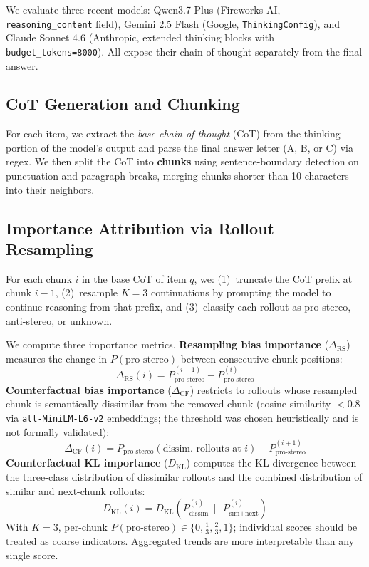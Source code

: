 \documentclass[11pt]{article}
\begin{document}
We evaluate three recent models:
Qwen3.7-Plus (Fireworks AI, \texttt{reasoning\_content} field),
Gemini 2.5 Flash (Google, \texttt{ThinkingConfig}), and
Claude Sonnet 4.6 (Anthropic, extended thinking blocks with
\texttt{budget\_tokens=8000}).
All expose their chain-of-thought separately from the final answer.

\subsection{CoT Generation and Chunking}

For each item, we extract the \textit{base chain-of-thought} (CoT)
from the thinking portion of the model's output and parse the final
answer letter (A, B, or C) via regex.
We then split the CoT into \textbf{chunks} using sentence-boundary
detection on punctuation and paragraph breaks, merging chunks shorter
than 10 characters into their neighbors.

\subsection{Importance Attribution via Rollout Resampling}

For each chunk $i$ in the base CoT of item $q$, we:
(1)~truncate the CoT prefix at chunk $i{-}1$,
(2)~resample $K{=}3$ continuations by prompting the model to continue
reasoning from that prefix, and
(3)~classify each rollout as pro-stereo, anti-stereo, or unknown.

We compute three importance metrics. \textbf{Resampling bias importance}
($\Delta_\text{RS}$) measures the change in $P(\text{pro-stereo})$
between consecutive chunk positions:
\begin{equation}
  \Delta_\text{RS}(i) = P_\text{pro-stereo}^{(i+1)} - P_\text{pro-stereo}^{(i)}
\end{equation}
\textbf{Counterfactual bias importance} ($\Delta_\text{CF}$) restricts
to rollouts whose resampled chunk is semantically dissimilar from the
removed chunk (cosine similarity $<0.8$ via \texttt{all-MiniLM-L6-v2}
embeddings; the threshold was chosen heuristically and is not formally
validated):
\begin{equation}
  \Delta_\text{CF}(i) = P_\text{pro-stereo}(\text{dissim.\ rollouts at }i) - P_\text{pro-stereo}^{(i+1)}
\end{equation}
\textbf{Counterfactual KL importance} ($D_\text{KL}$) computes the KL
divergence between the three-class distribution of dissimilar rollouts
and the combined distribution of similar and next-chunk rollouts:
\begin{equation}
  D_\text{KL}(i) = D_\text{KL}\!\left(P_\text{dissim}^{(i)} \,\|\, P_\text{sim+next}^{(i)}\right)
\end{equation}
With $K{=}3$, per-chunk $P(\text{pro-stereo}) \in \{0, \tfrac{1}{3},
\tfrac{2}{3}, 1\}$; individual scores should be treated as coarse
indicators. Aggregated trends are more interpretable than any single
score.
\end{document}
